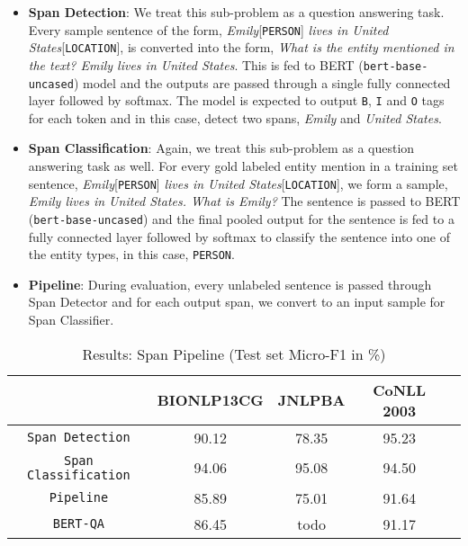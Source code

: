 \begin{itemize}
    \item \textbf{Span Detection}: We treat this sub-problem as a question answering task. Every sample sentence of the form, \textit{Emily}[\texttt{PERSON}] \textit{lives in United States}[\texttt{LOCATION}], is converted into the form, \textit{What is the entity mentioned in the text? Emily lives in United States}. This is fed to BERT (\texttt{bert-base-uncased}) model and the outputs are passed through a single fully connected layer followed by softmax. The model is expected to output \texttt{B}, \texttt{I} and \texttt{O} tags for each token and in this case, detect two spans, \textit{Emily} and \textit{United States}. 
    
    \item \textbf{Span Classification}: Again, we treat this sub-problem as a question answering task as well. For every gold labeled entity mention in a training set sentence, \textit{Emily}[\texttt{PERSON}] \textit{lives in United States}[\texttt{LOCATION}], we form a sample, \textit{Emily lives in United States. What is Emily?} The sentence is passed to BERT (\texttt{bert-base-uncased}) and the final pooled output for the sentence is fed to a fully connected layer followed by softmax to classify the sentence into one of the entity types, in this case, \texttt{PERSON}.
    
    \item \textbf{Pipeline}: During evaluation, every unlabeled sentence is passed through Span Detector and for each output span, we convert to an input sample for Span Classifier.
\end{itemize}

\begin{table}[h!]
\centering
\begin{tabular}{|c|c|c|c|c|}\hline
	\textbf{} & \textbf{BIONLP13CG} & \textbf{JNLPBA} & \textbf{CoNLL 2003}\\\hline
	\texttt{Span Detection} & 90.12 & 78.35 & 95.23\\\hline
	\texttt{Span Classification} & 94.06 & 95.08 & 94.50\\\hline
	\texttt{Pipeline} & 85.89 & 75.01 & 91.64\\\hline
	\texttt{BERT-QA} & 86.45 & todo & 91.17\\\hline
	\end{tabular}
    \caption{Results: Span Pipeline (Test set Micro-F1 in \%)}
    \label{tab:res_span}
\end{table}

